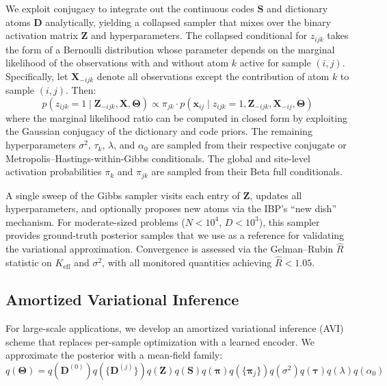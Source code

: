 \documentclass[11pt,a4paper]{article}
\theoremstyle{definition}
\begin{document}
We exploit conjugacy to integrate out the continuous codes $\mathbf{S}$ and dictionary atoms $\mathbf{D}$ analytically, yielding a collapsed sampler that mixes over the binary activation matrix $\mathbf{Z}$ and hyperparameters. The collapsed conditional for $z_{ijk}$ takes the form of a Bernoulli distribution whose parameter depends on the marginal likelihood of the observations with and without atom $k$ active for sample $(i,j)$. Specifically, let $\mathbf{X}_{-ijk}$ denote all observations except the contribution of atom $k$ to sample $(i,j)$. Then:
\begin{equation}
  p(z_{ijk}{=}1 \mid \mathbf{Z}_{-ijk}, \mathbf{X}, \boldsymbol{\Theta}) \propto \pi_{jk} \cdot p(\mathbf{x}_{ij} \mid z_{ijk}{=}1, \mathbf{Z}_{-ijk}, \mathbf{X}_{-ij}, \boldsymbol{\Theta}) \label{eq:gibbs}
\end{equation}
where the marginal likelihood ratio can be computed in closed form by exploiting the Gaussian conjugacy of the dictionary and code priors. The remaining hyperparameters $\sigma^2$, $\tau_k$, $\lambda$, and $\alpha_0$ are sampled from their respective conjugate or Metropolis--Hastings-within-Gibbs conditionals. The global and site-level activation probabilities $\pi_k$ and $\pi_{jk}$ are sampled from their Beta full conditionals.

A single sweep of the Gibbs sampler visits each entry of $\mathbf{Z}$, updates all hyperparameters, and optionally proposes new atoms via the IBP's ``new dish'' mechanism. For moderate-sized problems ($N < 10^4$, $D < 10^3$), this sampler provides ground-truth posterior samples that we use as a reference for validating the variational approximation. Convergence is assessed via the Gelman--Rubin $\hat{R}$ statistic on $K_{\mathrm{eff}}$ and $\sigma^2$, with all monitored quantities achieving $\hat{R} < 1.05$.

\subsection{Amortized Variational Inference}

For large-scale applications, we develop an amortized variational inference (AVI) scheme that replaces per-sample optimization with a learned encoder. We approximate the posterior with a mean-field family:
\begin{equation}
  q(\boldsymbol{\Theta}) = q(\mathbf{D}^{(0)})q(\{\mathbf{D}^{(j)}\})q(\mathbf{Z})q(\mathbf{S})q(\boldsymbol{\pi})q(\{\boldsymbol{\pi}_j\})q(\sigma^2)q(\boldsymbol{\tau})q(\lambda)q(\alpha_0) \label{eq:mf}
\end{equation}
\end{document}
